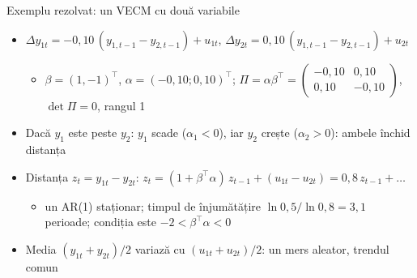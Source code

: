 \begin{frame}{Exemplu rezolvat: un VECM cu două variabile}
\itemsize{\small}
\begin{itemize}
    \item $\Delta y_{1t} = -0{,}10\,(y_{1,t-1} - y_{2,t-1}) + u_{1t}$, \quad $\Delta y_{2t} = 0{,}10\,(y_{1,t-1} - y_{2,t-1}) + u_{2t}$
    \begin{itemize}
        \item $\beta = (1, -1)^\top$, $\alpha = (-0{,}10; 0{,}10)^\top$; $\Pi = \alpha\beta^\top = \begin{pmatrix} -0{,}10 & 0{,}10 \\ 0{,}10 & -0{,}10 \end{pmatrix}$, $\det\Pi = 0$, rangul 1
    \end{itemize}
    \item Dacă $y_1$ este peste $y_2$: $y_1$ scade ($\alpha_1 < 0$), iar $y_2$ crește ($\alpha_2 > 0$): ambele închid distanța
    \item Distanța $z_t = y_{1t} - y_{2t}$: $z_t = (1 + \beta^\top\alpha)\,z_{t-1} + (u_{1t} - u_{2t}) = 0{,}8\,z_{t-1} + \dots$
    \begin{itemize}
        \item un AR(1) staționar; timpul de înjumătățire $\ln 0{,}5/\ln 0{,}8 = 3{,}1$ perioade; condiția este $-2 < \beta^\top\alpha < 0$
    \end{itemize}
    \item Media $(y_{1t} + y_{2t})/2$ variază cu $(u_{1t} + u_{2t})/2$: un mers aleator, trendul comun
\end{itemize}
\end{frame}

